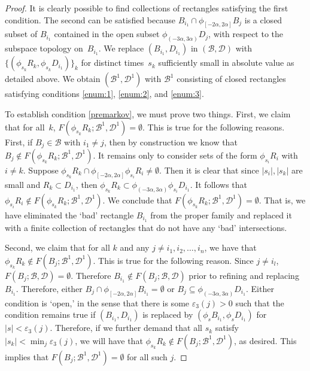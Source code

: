 \documentclass[11pt]{article}
\let\mathcal\mathscr
\let\epsilon\varepsilon
\theoremstyle{definition}
\numberwithin{equation}{section}
\newcommand\BBB{\mathcal B}
\begin{document}
\begin{proof}
It is clearly possible to find collections of rectangles satisfying the first condition. The second can be satisfied because $B_{i_1} \cap \phi_{[-2\alpha, 2\alpha]}B_j$ is a closed subset of $B_{i_1}$ contained in the open subset $\phi_{(-3\alpha,3\alpha)} D_j$, with respect to the subspace topology on~$B_{i_1}$.
We replace $(B_{i_1}, D_{i_1})$ in $(\mathcal{B}, \mathcal{D})$ with $\{(\phi_{s_{k}}R_{k}, \phi_{s_{k}} D_{i_1})\}_k$ for distinct times~$s_{k}$ sufficiently small in absolute value as detailed above. We obtain $(\mathcal{B}^1, \mathcal{D}^1)$ with $\mathcal{B}^1$ consisting of closed rectangles satisfying conditions \eqref{enum:1}, \eqref{enum:2}, and \eqref{enum:3}.

To establish condition \eqref{premarkov}, we must prove two things. First, we claim that for all~$k$, $F(\phi_{s_{k}}R_{k}; \mathcal{B}^1, \mathcal{D}^1) = \emptyset$. This is true for the following reasons. First, if $B_j \in \BBB$ with $i_1 \neq j$, then by construction we know that $B_j \notin F(\phi_{s_{k}}R_{k}; \mathcal{B}^1,\mathcal{D}^1)$. It remains only to consider sets of the form $\phi_{s_{i}}R_{i}$ with $i \neq k$. Suppose $\phi_{s_{k}}R_{k} \cap \phi_{[-2\alpha, 2 \alpha]} \phi_{s_{i}}R_{i} \neq \emptyset$. Then it is clear that since $|s_i|, |s_k|$ are small and $R_k \subset D_{i_1}$, then $\phi_{s_{k}}R_{k} \subset \phi_{(-3 \alpha, 3 \alpha)} \phi_{s_i} D_{i_1}$. It follows that $\phi_{s_{i}}R_{i} \notin F(\phi_{s_{k}}R_{k}; \mathcal{B}^1,\mathcal{D}^1)$. We conclude that $F(\phi_{s_{k}}R_{k}; \mathcal{B}^1, \mathcal{D}^1) = \emptyset$.
That is, we have eliminated the `bad' rectangle $B_{i_1}$ from the proper family and replaced it with a finite collection of rectangles that do not have any `bad' intersections.

Second, we claim that for all $k$ and any $j \neq i_1, i_2, \ldots, i_n$, we have that $\phi_{s_k}R_k \notin F(B_j; \mathcal{B}^1,\mathcal{D}^1)$. This is true for the following reason. Since $j \neq i_l$, $F(B_j;\mathcal{B},\mathcal{D}) = \emptyset$. Therefore $B_{i_1}\notin F(B_j; \mathcal{B},\mathcal{D})$ prior to refining and replacing $B_{i_1}$. Therefore, either $B_j \cap \phi_{[-2\alpha,2\alpha]}B_{i_1} = \emptyset$ or $B_j\subseteq \phi_{(-3\alpha,3\alpha)}D_{i_1}$. Either condition is `open,' in the sense that there is some $\epsilon_3(j)>0$ such that the condition remains true if $(B_{i_1},D_{i_1})$ is replaced by $(\phi_s B_{i_1}, \phi_s D_{i_1})$ for $|s|<\epsilon_3(j)$. Therefore, if we further demand that all $s_k$ satisfy $|s_k|<\min_j \epsilon_3(j)$, we will have that $\phi_{s_k}R_k \notin F(B_j; \mathcal{B}^1,\mathcal{D}^1)$, as desired. This implies that $F(B_j;\mathcal{B}^1,\mathcal{D}^1)=\emptyset$ for all such $j$.


\end{proof}
\end{document}
